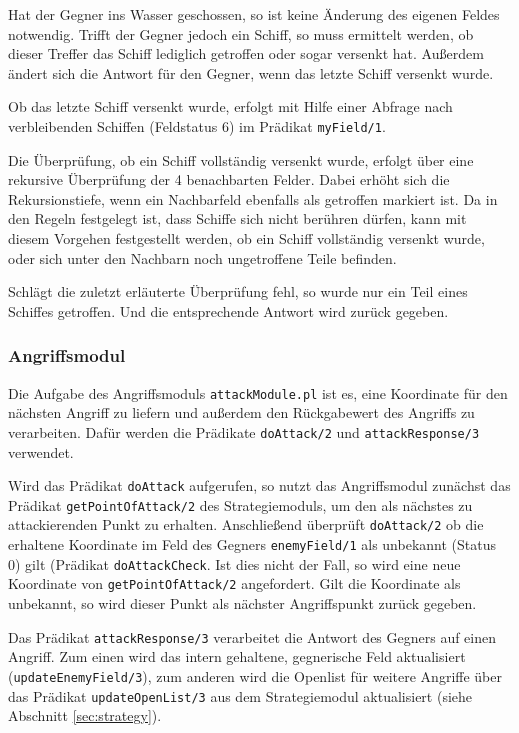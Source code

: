 	Hat der Gegner ins Wasser geschossen, so ist keine Änderung des eigenen Feldes notwendig. Trifft der Gegner jedoch ein Schiff,
	so muss ermittelt werden, ob dieser Treffer das Schiff lediglich getroffen oder sogar versenkt hat. Außerdem ändert sich die Antwort
	für den Gegner, wenn das letzte Schiff versenkt wurde.
	
	Ob das letzte Schiff versenkt wurde, erfolgt mit Hilfe einer Abfrage nach verbleibenden Schiffen (Feldstatus 6) im Prädikat \texttt{myField/1}.
	
	Die Überprüfung, ob ein Schiff vollständig versenkt wurde, erfolgt über eine rekursive Überprüfung der 4 benachbarten Felder.
	Dabei erhöht sich die Rekursionstiefe, wenn ein Nachbarfeld ebenfalls als getroffen markiert ist. 
	Da in den Regeln festgelegt ist, dass Schiffe sich nicht berühren dürfen, kann mit diesem Vorgehen festgestellt werden, ob ein Schiff
	vollständig versenkt wurde, oder sich unter den Nachbarn noch ungetroffene Teile befinden.
	
	Schlägt die zuletzt erläuterte Überprüfung fehl, so wurde nur ein Teil eines Schiffes getroffen. Und die entsprechende Antwort wird zurück 
	gegeben.
	
	
\subsubsection{Angriffsmodul} \label{sec:attackModule}
	Die Aufgabe des Angriffsmoduls \texttt{attackModule.pl} ist es, eine Koordinate für den nächsten Angriff zu liefern und außerdem den 
	Rückgabewert des Angriffs zu verarbeiten. 
	Dafür werden die Prädikate \texttt{doAttack/2} und \texttt{attackResponse/3} verwendet. 
	
	Wird das Prädikat \texttt{doAttack} aufgerufen, so nutzt das Angriffsmodul zunächst das Prädikat \texttt{getPointOfAttack/2} des
	Strategiemoduls, um den als nächstes zu attackierenden Punkt zu erhalten. Anschließend überprüft \texttt{doAttack/2} 
	ob die erhaltene Koordinate im Feld des Gegners \texttt{enemyField/1} als unbekannt (Status 0) gilt (Prädikat \texttt{doAttackCheck}. 
	Ist dies nicht der Fall, so wird eine neue Koordinate von \texttt{getPointOfAttack/2} angefordert. 
	Gilt die Koordinate als unbekannt, so wird dieser Punkt als nächster Angriffspunkt zurück gegeben.
	
	Das Prädikat \texttt{attackResponse/3} verarbeitet die Antwort des Gegners auf einen Angriff. Zum einen wird das intern gehaltene, 
	gegnerische Feld aktualisiert (\texttt{updateEnemyField/3}), zum anderen wird die Openlist für weitere Angriffe über 
	das Prädikat \texttt{updateOpenList/3} aus dem Strategiemodul aktualisiert (siehe Abschnitt \ref{sec:strategy}).
	
